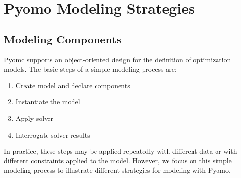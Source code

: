 
\chapter{Pyomo Modeling Strategies}
\label{chap:overview}


\section{Modeling Components}

Pyomo supports an object-oriented design for the definition of
optimization models.  The basic steps of a simple modeling process are:
\begin{enumerate}

\item Create model and declare components 
\item Instantiate the model
\item Apply solver
\item Interrogate solver results

\end{enumerate}
In practice, these steps may be applied repeatedly with different data or with 
different constraints applied to the model.  However, we focus on this
simple modeling process to illustrate different strategies for modeling with
Pyomo.

